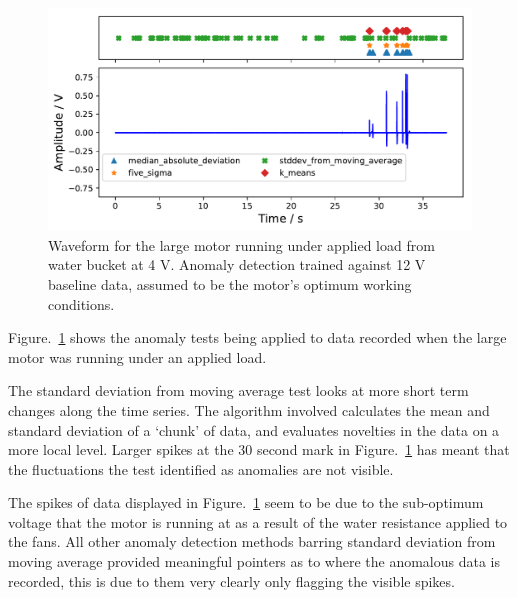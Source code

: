 \begin{figure}[t]
    \includegraphics[width=1.0\textwidth]{fig/large_4V-9A_water_large_12V.pdf}
    \caption[Anomaly Plot Large Motor under Load]{Waveform for the large motor running under applied load from water bucket at 4 V. Anomaly detection trained against 12 V baseline data, assumed to be the motor's optimum working conditions.}
    \label{fig:largemotor_water4V}
\end{figure}

Figure.~\ref{fig:largemotor_water4V} shows the anomaly tests being applied to data recorded when the large motor was running under an applied load.

The standard deviation from moving average test looks at more short term changes along the time series. The algorithm involved calculates the mean and standard deviation of a `chunk' of data, and evaluates novelties in the data on a more local level. Larger spikes at the 30 second mark in Figure.~\ref{fig:largemotor_water4V} has meant that the fluctuations the test identified as anomalies are not visible.

The spikes of data displayed in Figure.~\ref{fig:largemotor_water4V} seem to be due to the sub-optimum voltage that the motor is running at as a result of the water resistance applied to the fans. All other anomaly detection methods barring standard deviation from moving average provided meaningful pointers as to where the anomalous data is recorded, this is due to them very clearly only flagging the visible spikes.




